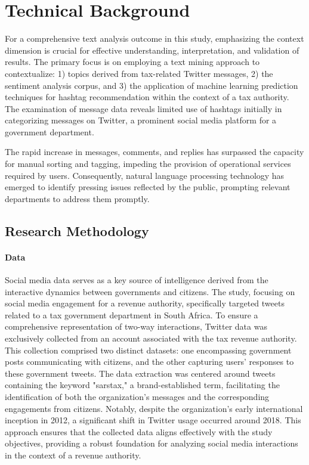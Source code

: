




\chapter{Technical Background}
\label{chap:third}

For a comprehensive text analysis outcome in this study, emphasizing the context dimension is crucial for effective understanding, interpretation, and validation of results. The primary focus is on employing a text mining approach to contextualize: 1) topics derived from tax-related Twitter messages, 2) the sentiment analysis corpus, and 3) the application of machine learning prediction techniques for hashtag recommendation within the context of a tax authority. The examination of message data reveals limited use of hashtags initially in categorizing messages on Twitter, a prominent social media platform for a government department.

The rapid increase in messages, comments, and replies has surpassed the capacity for manual sorting and tagging, impeding the provision of operational services required by users. Consequently, natural language processing technology has emerged to identify pressing issues reflected by the public, prompting relevant departments to address them promptly.

\section{Research Methodology}

\subsubsection{Data}

Social media data serves as a key source of intelligence derived from the interactive dynamics between governments and citizens. The study, focusing on social media engagement for a revenue authority, specifically targeted tweets related to a tax government department in South Africa. To ensure a comprehensive representation of two-way interactions, Twitter data was exclusively collected from an account associated with the tax revenue authority. This collection comprised two distinct datasets: one encompassing government posts communicating with citizens, and the other capturing users' responses to these government tweets. The data extraction was centered around tweets containing the keyword "sarstax," a brand-established term, facilitating the identification of both the organization's messages and the corresponding engagements from citizens. Notably, despite the organization's early international inception in 2012, a significant shift in Twitter usage occurred around 2018. This approach ensures that the collected data aligns effectively with the study objectives, providing a robust foundation for analyzing social media interactions in the context of a revenue authority.

